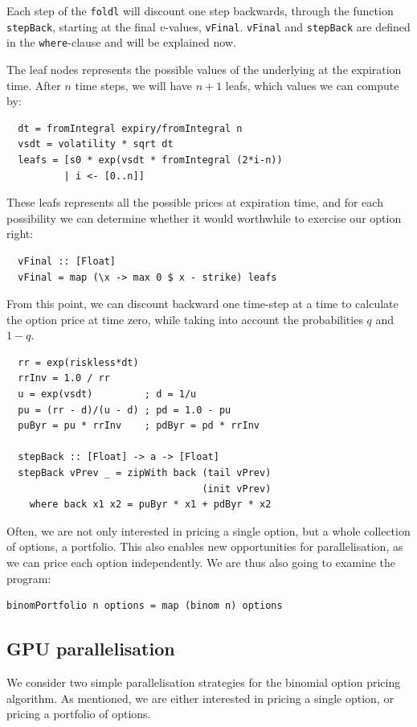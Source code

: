 \documentclass[preprint]{sigplanconf}
\begin{document}
Each step of the \verb|foldl| will discount one step backwards,
through the function \verb|stepBack|, starting at the final
$v$-values, \verb|vFinal|. \verb|vFinal| and \verb|stepBack| are
defined in the \verb|where|-clause and will be explained now.

The leaf nodes represents the possible values of the underlying at
the expiration time. After $n$ time steps, we will have $n+1$ leafs, which
values we can compute by:
\begin{verbatim}
  dt = fromIntegral expiry/fromIntegral n
  vsdt = volatility * sqrt dt
  leafs = [s0 * exp(vsdt * fromIntegral (2*i-n))
          | i <- [0..n]]
\end{verbatim}
These leafs represents all the possible prices at expiration time, and
for each possibility we can determine whether it would worthwhile to
exercise our option right:
\begin{verbatim}
  vFinal :: [Float]
  vFinal = map (\x -> max 0 $ x - strike) leafs
\end{verbatim}
From this point, we can discount backward one time-step at a time to
calculate the option price at time zero, while taking into account the
probabilities $q$ and $1-q$.
\begin{verbatim}
  rr = exp(riskless*dt)
  rrInv = 1.0 / rr
  u = exp(vsdt)         ; d = 1/u
  pu = (rr - d)/(u - d) ; pd = 1.0 - pu
  puByr = pu * rrInv    ; pdByr = pd * rrInv

  stepBack :: [Float] -> a -> [Float]
  stepBack vPrev _ = zipWith back (tail vPrev)
                                  (init vPrev)
    where back x1 x2 = puByr * x1 + pdByr * x2
\end{verbatim}

Often, we are not only interested in pricing a single option, but a
whole collection of options, a portfolio. This also enables new
opportunities for parallelisation, as we can price each option
independently. We are thus also going to examine the program:

\begin{verbatim}
binomPortfolio n options = map (binom n) options
\end{verbatim}

\subsection{GPU parallelisation}
\label{sec:gpubinom}
We consider two simple parallelisation strategies for the binomial
option pricing algorithm. As mentioned, we are either interested in
pricing a single option, or pricing a portfolio of options.
\end{document}
